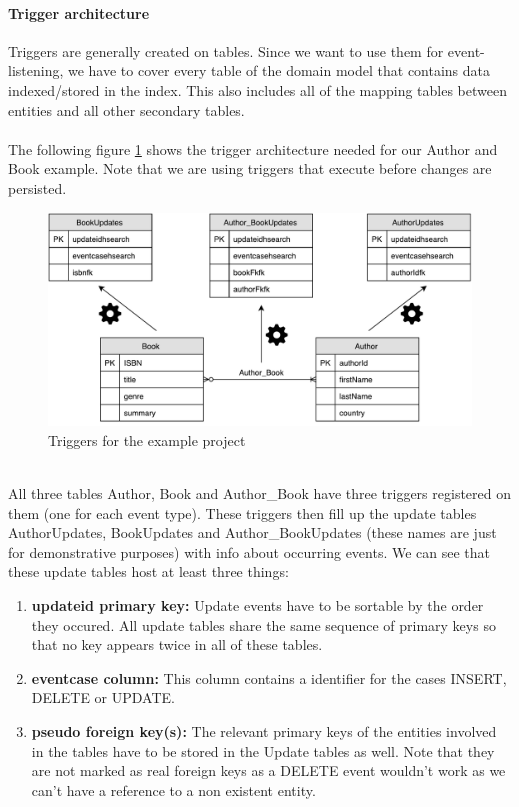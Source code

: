 \pagebreak

\paragraph{Trigger architecture}

Triggers are generally created on tables. Since we want to use them for event-listening, we have to cover every table of the domain model that contains data indexed/stored in the index. This also includes all of the mapping tables between entities and all other secondary tables.
\\\\
The following figure \ref{triggers_schema} shows the trigger architecture needed for our Author and Book example. Note that we are using triggers that execute before changes are persisted.
\\
\begin{figure}[ht]
	\centering
	\includegraphics[scale=0.6]{images/Triggers_Schema.pdf}
	\caption{Triggers for the example project}
	\label{triggers_schema}
\end{figure}
\\
\noindent
All three tables Author, Book and Author\_Book have three triggers registered on them (one for each event type). These triggers then fill up the update tables AuthorUpdates, BookUpdates and Author\_BookUpdates (these names are just for demonstrative purposes) with info about occurring events. We can see that these update tables host at least three things:

\begin{enumerate}
	\item \textbf{updateid primary key:} Update events have to be sortable by the order they occured. All update tables share the same sequence of primary keys so that no key appears twice in all of these tables.
	\item \textbf{eventcase column:} This column contains a identifier for the cases INSERT, DELETE or UPDATE.
	\item \textbf{pseudo foreign key(s):} The relevant primary keys of the entities involved in the tables have to be stored in the Update tables as well. Note that they are not marked as real foreign keys as a DELETE event wouldn't work as we can't have a reference to a non existent entity.
\end{enumerate}

